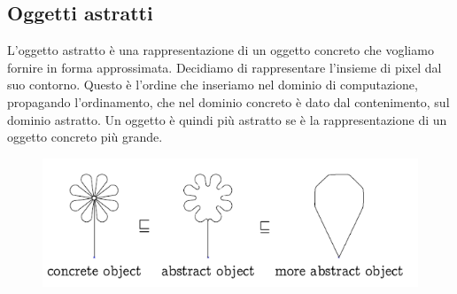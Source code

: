 \subsection{Oggetti astratti}
L'oggetto astratto è una rappresentazione di un oggetto concreto che vogliamo fornire in 
forma approssimata. Decidiamo di rappresentare l'insieme di pixel dal suo contorno.
Questo è l'ordine che inseriamo nel dominio di computazione, propagando l'ordinamento,
che nel dominio concreto è dato dal contenimento, sul dominio astratto.
Un oggetto è quindi più astratto se è la rappresentazione di un oggetto concreto più grande.

\begin{figure}[H]
    \centering
    \includegraphics[scale=0.6]{img/abstractobj.png}
\end{figure}
